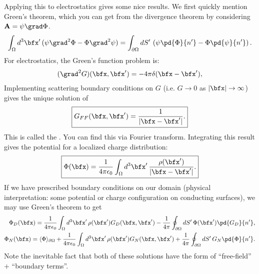 \documentclass[11pt]{article}
\begin{document}
Applying this to electrostatics gives some nice results. We first
quickly mention Green's theorem, which you can get from the divergence
theorem by considering $\mathbf{A} = \psi \grad \Phi$.
\begin{align*}
    \int_{\Omega} d^3\bfx' \, (\psi \grad^2 \Phi - \Phi \grad^2 \psi)
    = \int_{\partial \Omega} dS' \, \left( \psi \pd{\Phi}{n'} - \Phi \pd{\psi}{n'} \right).
\end{align*}
For electrostatics, the Green's function problem is:
\begin{align*}
    (\grad^2 G)(\bfx, \bfx') = - 4\pi \delta(\bfx - \bfx'),
\end{align*}
Implementing scattering boundary conditions on $G$ (i.e.
$G \to 0$ as $|\bfx| \to \infty$) gives the unique solution of
\begin{align*}
    \boxed{G_{FF}(\bfx, \bfx') = \frac{1}{|\bfx - \bfx'|}.}
\end{align*}
This is called the .
You can find this via Fourier transform. Integrating this 
result gives the potential for a localized charge distribution:
\begin{align}
    \boxed{\Phi(\bfx) = \frac{1}{4\pi \epsilon_0} \int_{\Omega} d^3\bfx' \, \frac{\rho(\bfx')}{|\bfx - \bfx'|}.}
    \label{freeFieldPotential}
\end{align}
If we have prescribed boundary conditions on
our domain (physical interpretation: some potential
or charge configuration on conducting surfaces),
we may use Green's theorem to get
\begin{align*}
    \Phi_{D}(\bfx) = \frac{1}{4\pi\epsilon_0} \int_{\Omega} d^3\bfx' \, \rho(\bfx') G_D(\bfx, \bfx')
    - \frac{1}{4\pi} \oint_{\partial \Omega} dS' \, \Phi(\bfx') \pd{G_D}{n'},\\
    \Phi_{N}(\bfx) = \langle \Phi \rangle_{\partial \Omega} + \frac{1}{4\pi\epsilon_0} \int_{\Omega} d^3\bfx' \, \rho(\bfx') G_N(\bfx, \bfx')
    + \frac{1}{4\pi} \oint_{\partial \Omega} dS' \, G_N \pd{\Phi}{n'}.
\end{align*}
Note the inevitable fact that both of these solutions have the form
of ``free-field'' $+$ ``boundary terms''.

\end{document}
